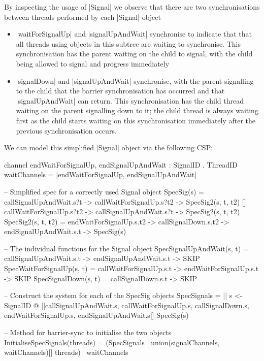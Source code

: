 By inspecting the usage of |Signal| we observe that there are two synchronisations between threads performed by each |Signal| object %
\inlineScala
\begin{itemize}
  \item |waitForSignalUp| and |signalUpAndWait| synchronise to indicate that that all threads using objects in this subtree are waiting to synchronise. This synchronisation has the parent waiting on the child to signal, with the child being allowed to signal and progress immediately
  \item |signalDown| and |signalUpAndWait| synchronise, with the parent signalling to the child that the barrier synchronisation has occurred and that |signalUpAndWait| can return. This synchronisation has the child thread waiting on the parent signalling down to it; the child thread is always waiting first as the child starts waiting on this synchronisation immediately after the previous synchronisation occurs.
\end{itemize}
\inlineCSP
We can model this simplified |Signal| object via the following CSP:

  \begin{cspm}[caption={The CSP model of the specification {\scalastyle Signal} object}]
channel endWaitForSignalUp, endSignalUpAndWait : SignalID . ThreadID
waitChannels = {|endWaitForSignalUp, endSignalUpAndWait|}

-- Simplified spec for a correctly used Signal object
SpecSig(s) = 
    callSignalUpAndWait.s?t -> callWaitForSignalUp.s?t2 -> SpecSig2(s, t, t2)
  [] callWaitForSignalUp.s?t2 -> callSignalUpAndWait.s?t -> SpecSig2(s, t, t2)
SpecSig2(s, t, t2) = 
  endWaitForSignalUp.s.t2 -> callSignalDown.s.t2 -> endSignalUpAndWait.s.t -> SpecSig(s)

-- The individual functions for the Signal object
SpecSignalUpAndWait(s, t) = callSignalUpAndWait.s.t -> endSignalUpAndWait.s.t -> SKIP
SpecWaitForSignalUp(s, t) = callWaitForSignalUp.s.t -> endWaitForSignalUp.s.t -> SKIP
SpecSignalDown(s, t) = callSignalDown.s.t -> SKIP

-- Construct the system for each of the SpecSig objects
SpecSignals = 
  || s <- SignalID @ [{|callSignalUpAndWait.s, callWaitForSignalUp.s, 
                        callSignalDown.s, endWaitForSignalUp.s, endSignalUpAndWait.s|}] 
                      SpecSig(s)

-- Method for barrier-sync to initialise the two objects
InitialiseSpecSignals(threads) = 
  (SpecSignals [|union(signalChannels, waitChannels)|] threads) \ waitChannels                     
  \end{cspm} 

